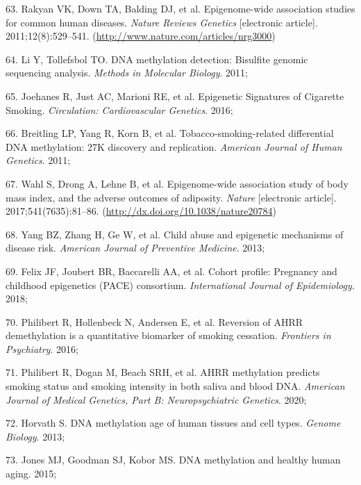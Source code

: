 \documentclass[11pt,oneside]{bristolthesis}
\newenvironment{cslreferences}%
  {}%
  {\par}
\begin{document}
\begin{cslreferences}
\leavevmode\hypertarget{ref-Rakyan2011}{}%
63. Rakyan VK, Down TA, Balding DJ, et al. Epigenome-wide association studies for common human diseases. \emph{Nature Reviews Genetics} {[}electronic article{]}. 2011;12(8):529--541. (\url{http://www.nature.com/articles/nrg3000})

\leavevmode\hypertarget{ref-Li2011}{}%
64. Li Y, Tollefsbol TO. DNA methylation detection: Bisulfite genomic sequencing analysis. \emph{Methods in Molecular Biology}. 2011;

\leavevmode\hypertarget{ref-Joehanes2016}{}%
65. Joehanes R, Just AC, Marioni RE, et al. Epigenetic Signatures of Cigarette Smoking. \emph{Circulation: Cardiovascular Genetics}. 2016;

\leavevmode\hypertarget{ref-Breitling2011}{}%
66. Breitling LP, Yang R, Korn B, et al. Tobacco-smoking-related differential DNA methylation: 27K discovery and replication. \emph{American Journal of Human Genetics}. 2011;

\leavevmode\hypertarget{ref-Wahl2017}{}%
67. Wahl S, Drong A, Lehne B, et al. Epigenome-wide association study of body mass index, and the adverse outcomes of adiposity. \emph{Nature} {[}electronic article{]}. 2017;541(7635):81--86. (\url{http://dx.doi.org/10.1038/nature20784})

\leavevmode\hypertarget{ref-Yang2013}{}%
68. Yang BZ, Zhang H, Ge W, et al. Child abuse and epigenetic mechanisms of disease risk. \emph{American Journal of Preventive Medicine}. 2013;

\leavevmode\hypertarget{ref-Felix2018}{}%
69. Felix JF, Joubert BR, Baccarelli AA, et al. Cohort profile: Pregnancy and childhood epigenetics (PACE) consortium. \emph{International Journal of Epidemiology}. 2018;

\leavevmode\hypertarget{ref-Philibert2016}{}%
70. Philibert R, Hollenbeck N, Andersen E, et al. Reversion of AHRR demethylation is a quantitative biomarker of smoking cessation. \emph{Frontiers in Psychiatry}. 2016;

\leavevmode\hypertarget{ref-Philibert2020}{}%
71. Philibert R, Dogan M, Beach SRH, et al. AHRR methylation predicts smoking status and smoking intensity in both saliva and blood DNA. \emph{American Journal of Medical Genetics, Part B: Neuropsychiatric Genetics}. 2020;

\leavevmode\hypertarget{ref-Horvath2013}{}%
72. Horvath S. DNA methylation age of human tissues and cell types. \emph{Genome Biology}. 2013;

\leavevmode\hypertarget{ref-Jones2015}{}%
73. Jones MJ, Goodman SJ, Kobor MS. DNA methylation and healthy human aging. 2015;


\end{cslreferences}
\end{document}
